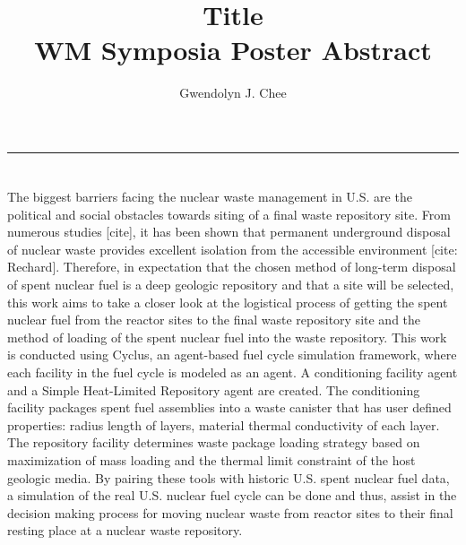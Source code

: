 \documentclass[11pt,letterpaper]{article}
\title{Title
        \\ \vspace{0.5em} WM Symposia Poster Abstract}
\author{Gwendolyn J. Chee}
\begin{document}
	\maketitle
	\hrule

\section*{}
\doublespacing
The biggest barriers facing the nuclear waste management in U.S. are the political and social obstacles towards siting of a final waste repository site. From numerous studies [cite], it has been shown that permanent underground disposal of nuclear waste provides excellent isolation from the accessible environment [cite: Rechard]. Therefore, in expectation that the chosen method of long-term disposal of spent nuclear fuel is a deep geologic repository and that a site will be selected, this work aims to take a closer look at the logistical process of getting the spent nuclear fuel from the reactor sites to the final waste repository site and the method of loading of the spent nuclear fuel into the waste repository. This work is conducted using Cyclus, an agent-based fuel cycle simulation framework, where each facility in the fuel cycle is modeled as an agent. A conditioning facility agent and a Simple Heat-Limited Repository agent are created. The conditioning facility packages spent fuel assemblies into a waste canister that has user defined properties: radius length of layers, material thermal conductivity of each layer. The repository facility determines waste package loading strategy based on maximization of mass loading and the thermal limit constraint of the host geologic media. By pairing these tools with historic U.S. spent nuclear fuel data, a simulation of the real U.S. nuclear fuel cycle can be done and thus, assist in the decision making process for moving nuclear waste from reactor sites to their final resting place at a nuclear waste repository. 
\end{document}
